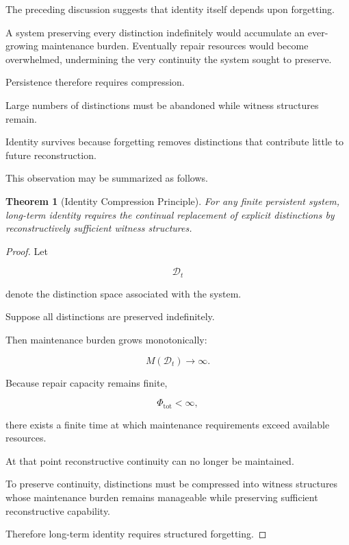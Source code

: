 \documentclass[12pt,oneside]{book}
\theoremstyle{plain} \newtheorem{theorem}{Theorem}[chapter] \newtheorem{lemma}[theorem]{Lemma} \newtheorem{proposition}[theorem]{Proposition} \newtheorem{corollary}[theorem]{Corollary}
\theoremstyle{definition} \newtheorem{definition}[theorem]{Definition} \newtheorem{axiom}[theorem]{Axiom} \newtheorem{construction}[theorem]{Construction}
\theoremstyle{remark} \newtheorem{remark}[theorem]{Remark} \newtheorem{example}[theorem]{Example}
\newcommand{\D}{\mathcal{D}} \newcommand{\R}{\mathcal{R}} \newcommand{\F}{\mathcal{F}} \newcommand{\U}{\mathcal{U}} \newcommand{\M}{\mathcal{M}} \newcommand{\G}{\Gamma}
\begin{document}
The preceding discussion suggests that identity itself depends upon forgetting.

A system preserving every distinction indefinitely would accumulate an ever-growing maintenance burden. Eventually repair resources would become overwhelmed, undermining the very continuity the system sought to preserve.

Persistence therefore requires compression.

Large numbers of distinctions must be abandoned while witness structures remain.

Identity survives because forgetting removes distinctions that contribute little to future reconstruction.

This observation may be summarized as follows.

\begin{theorem}[Identity Compression Principle]

For any finite persistent system, long-term identity requires the continual replacement of explicit distinctions by reconstructively sufficient witness structures.

\end{theorem}

\begin{proof}

Let

\[
\D_t
\]

denote the distinction space associated with the system.

Suppose all distinctions are preserved indefinitely.

Then maintenance burden grows monotonically:

\[
M(\D_t)
\rightarrow
\infty.
\]

Because repair capacity remains finite,

\[
\Phi_{\mathrm{tot}}
<
\infty,
\]

there exists a finite time at which maintenance requirements exceed available resources.

At that point reconstructive continuity can no longer be maintained.

To preserve continuity, distinctions must be compressed into witness structures whose maintenance burden remains manageable while preserving sufficient reconstructive capability.

Therefore long-term identity requires structured forgetting.

\end{proof}
\end{document}
